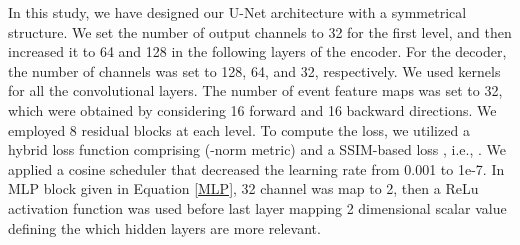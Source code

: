 \documentclass{article}
\begin{document}
In this study, we have designed our U-Net architecture with a symmetrical structure. We set the number of output channels to 32 for the first level, 
and then increased it to 64 and 128 in the following layers of the encoder. For the decoder, the number of channels was set to 128, 64, and 32, respectively.
We used  kernels for all the convolutional layers. The number of event feature maps was set to 32, which were obtained by considering 16 
forward and 16 backward directions. We employed 8 residual blocks at each level. To compute the loss, we utilized a hybrid loss 
function comprising   (-norm metric) and a SSIM-based loss , i.e., . We applied a 
cosine scheduler that decreased the learning rate from 0.001 to 1e-7. In MLP block given in Equation \eqref{MLP}, 32 channel was map to 2, then a ReLu activation function
was used before last layer mapping 2 dimensional scalar value defining the which hidden layers are more relevant. 
\end{document}
